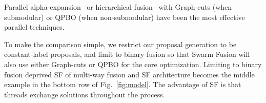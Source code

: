 
\noindent
Parallel alpha-expansion~\cite{delong} or hierarchical
fusion~\cite{delong,olga} with Graph-cuts (when submodular) or QPBO
(when non-submodular) have been the most effective parallel techniques.
%


\noindent
To make the comparison simple, we restrict our proposal generation to be
constant-label proposals, and limit to binary fusion so that Swarm
Fusion will also use either Graph-cuts or QPBO for the core
optimization. Limiting to binary fusion deprived SF of multi-way fusion
and SF architecture becomes the middle example in the bottom row of
Fig.~\ref{fig:model}.
%
The advantage of SF is that threads exchange solutions throughout the
process.

